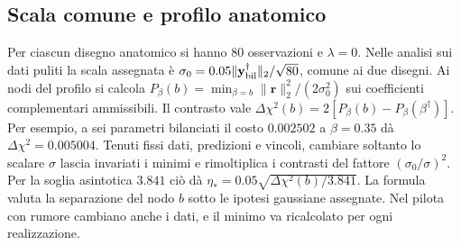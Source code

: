 \subsection{Scala comune e profilo anatomico}
Per ciascun disegno anatomico si hanno 80 osservazioni e $\lambda=0$. Nelle analisi sui dati puliti la scala assegnata è $\sigma_0=0.05\|\mathbf y^\dagger_{\rm bil}\|_2/\sqrt{80}$, comune ai due disegni. Ai nodi del profilo si calcola $P_\beta(b)=\min_{\beta=b}\|\mathbf r\|_2^2/(2\sigma_0^2)$ sui coefficienti complementari ammissibili. Il contrasto vale $\Delta\chi^2(b)=2[P_\beta(b)-P_\beta(\beta^\dagger)]$. Per esempio, a sei parametri bilanciati il costo $0.002502$ a $\beta=0.35$ dà $\Delta\chi^2=0.005004$. Tenuti fissi dati, predizioni e vincoli, cambiare soltanto lo scalare $\sigma$ lascia invariati i minimi e rimoltiplica i contrasti del fattore $(\sigma_0/\sigma)^2$. Per la soglia asintotica $3.841$ ciò dà $\eta_*=0.05\sqrt{\Delta\chi^2(b)/3.841}$. La formula valuta la separazione del nodo $b$ sotto le ipotesi gaussiane assegnate. Nel pilota con rumore cambiano anche i dati, e il minimo va ricalcolato per ogni realizzazione.
